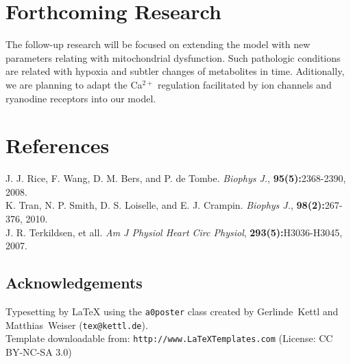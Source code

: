 \documentclass[a0,portrait]{a0poster}
\begin{document}
\begin{multicols}{2}
\section*{Forthcoming Research}

The follow-up research will be focused on extending the model with new
parameters relating with mitochondrial dysfunction. Such pathologic
conditions are related with hypoxia and subtler changes of metabolites in
time. Aditionally, we are planning to adapt the Ca${^\mathrm{2+}}$
regulation facilitated by ion channels and ryanodine receptors into our
model.

\section*{References}

J. J. Rice, F. Wang, D. M. Bers, and P. de Tombe. \textit{Biophys J.}, \textbf{95(5):}2368-2390, 2008.\\
K. Tran, N. P. Smith, D. S. Loiselle, and E. J. Crampin. \textit{Biophys J.}, \textbf{98(2):}267-376, 2010.\\
J. R. Terkildsen, et all. \textit{Am J Physiol Heart Circ Physiol}, \textbf{293(5):}H3036-H3045, 2007.



\subsection*{Acknowledgements}

\small{Typesetting by {\LaTeX} using the \texttt{a0poster} class
created by Gerlinde~Kettl and Matthias~Weiser (\texttt{tex@kettl.de}).\\
Template downloadable from: \texttt{http://www.LaTeXTemplates.com} (License: CC BY-NC-SA 3.0)}


\end{multicols}
\end{document}
